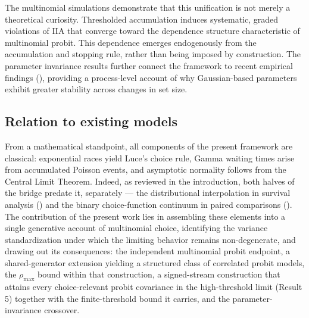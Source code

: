 \documentclass[
  man,
  floatsintext,
  longtable,
  a4paper,
  nolmodern,
  notxfonts,
  notimes,
  colorlinks=true,linkcolor=blue,citecolor=blue,urlcolor=blue]{apa7}
\begin{document}
The multinomial simulations demonstrate that this unification is not
merely a theoretical curiosity. Thresholded accumulation induces
systematic, graded violations of IIA that converge toward the dependence
structure characteristic of multinomial probit. This dependence emerges
endogenously from the accumulation and stopping rule, rather than being
imposed by construction. The parameter invariance results further
connect the framework to recent empirical findings
(),
providing a process-level account of why Gaussian-based parameters
exhibit greater stability across changes in set size.

\subsection{Relation to existing
models}\label{relation-to-existing-models}

From a mathematical standpoint, all components of the present framework
are classical: exponential races yield Luce's choice rule, Gamma waiting
times arise from accumulated Poisson events, and asymptotic normality
follows from the Central Limit Theorem. Indeed, as reviewed in the
introduction, both halves of the bridge predate it, separately --- the
distributional interpolation in survival analysis
() and the
binary choice-function continuum in paired comparisons
(). The
contribution of the present work lies in assembling these elements into
a single generative account of multinomial choice, identifying the
variance standardization under which the limiting behavior remains
non-degenerate, and drawing out its consequences: the independent
multinomial probit endpoint, a shared-generator extension yielding a
structured class of correlated probit models, the \(\rho_{\max}\) bound
within that construction, a signed-stream construction that attains
every choice-relevant probit covariance in the high-threshold limit
(Result 5) together with the finite-threshold bound it carries, and the
parameter-invariance crossover.
\end{document}
